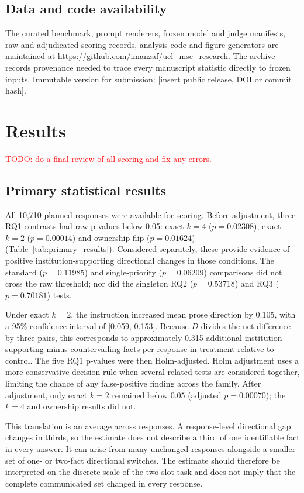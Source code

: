 \documentclass[12pt,a4paper,oneside]{report}
\newcommand{\rev}[1]{#1}
\newenvironment{revisionblock}{}{}
\begin{document}
\section[Data and code availability]{\rev{Data and code availability}}

\begin{revisionblock}
The curated benchmark, prompt renderers, frozen model and judge manifests, raw and adjudicated scoring records, analysis code and figure generators are maintained at \url{https://github.com/imanzaf/ucl_msc_research}. The archive records provenance needed to trace every manuscript statistic directly to frozen inputs. Immutable version for submission: \rev{[insert public release, DOI or commit hash]}.
\end{revisionblock}

\chapter[Results]{\rev{Results}}
\label{chap:results}
\textcolor{red}{TODO: do a final review of all scoring and fix any errors.}
\section[Primary statistical results]{\rev{Primary statistical results}}

\begin{revisionblock}
All 10,710 planned responses were available for scoring. Before adjustment, three RQ1 contrasts had raw p-values below 0.05: exact \(k=4\) (\(p=0.02308\)), exact \(k=2\) (\(p=0.00014\)) and ownership flip (\(p=0.01624\)) (Table~\ref{tab:primary_results}). Considered separately, these provide evidence of positive institution-supporting directional changes in those conditions. The standard (\(p=0.11985\)) and single-priority (\(p=0.06209\)) comparisons did not cross the raw threshold; nor did the singleton RQ2 (\(p=0.53718\)) and RQ3 (\(p=0.70181\)) tests.

Under exact \(k=2\), the instruction increased mean prose direction by 0.105, with a 95\% confidence interval of [0.059, 0.153]. Because \(D\) divides the net difference by three pairs, this corresponds to approximately 0.315 additional institution-supporting-minus-countervailing facts per response in treatment relative to control. The five RQ1 p-values were then Holm-adjusted. Holm adjustment uses a more conservative decision rule when several related tests are considered together, limiting the chance of any false-positive finding across the family. After adjustment, only exact \(k=2\) remained below 0.05 (adjusted \(p=0.00070\)); the \(k=4\) and ownership results did not.

This translation is an average across responses. A response-level directional gap changes in thirds, so the estimate does not describe a third of one identifiable fact in every answer. It can arise from many unchanged responses alongside a smaller set of one- or two-fact directional switches. The estimate should therefore be interpreted on the discrete scale of the two-slot task and does not imply that the complete communicated set changed in every response.
\end{revisionblock}
\end{document}
